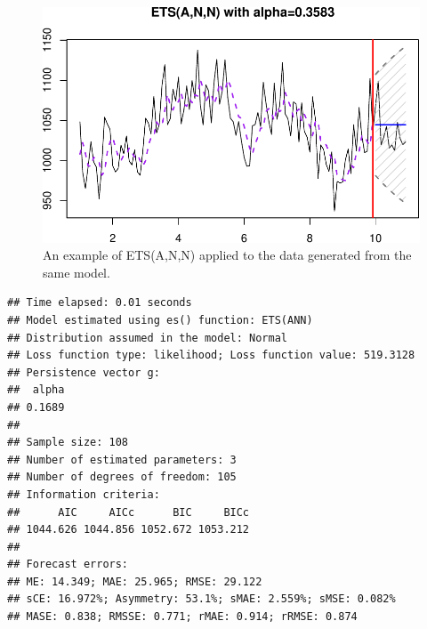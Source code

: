 \documentclass[
]{book}
\newenvironment{Shaded}{\begin{snugshade}}{\end{snugshade}}
\newcommand{\AttributeTok}[1]{\textcolor[rgb]{0.77,0.63,0.00}{#1}}
\newcommand{\CommentTok}[1]{\textcolor[rgb]{0.56,0.35,0.01}{\textit{#1}}}
\newcommand{\ConstantTok}[1]{\textcolor[rgb]{0.00,0.00,0.00}{#1}}
\newcommand{\DecValTok}[1]{\textcolor[rgb]{0.00,0.00,0.81}{#1}}
\newcommand{\FloatTok}[1]{\textcolor[rgb]{0.00,0.00,0.81}{#1}}
\newcommand{\FunctionTok}[1]{\textcolor[rgb]{0.00,0.00,0.00}{#1}}
\newcommand{\NormalTok}[1]{#1}
\newcommand{\OtherTok}[1]{\textcolor[rgb]{0.56,0.35,0.01}{#1}}
\newcommand{\SpecialCharTok}[1]{\textcolor[rgb]{0.00,0.00,0.00}{#1}}
\newcommand{\StringTok}[1]{\textcolor[rgb]{0.31,0.60,0.02}{#1}}
\theoremstyle{definition}
\theoremstyle{definition}
\theoremstyle{definition}
\theoremstyle{definition}
\theoremstyle{remark}
\begin{document}
\begin{Shaded}
\end{Shaded}

\begin{figure}
\centering
\includegraphics{Svetunkov--2022----ADAM_files/figure-latex/ETSANNExample-1.pdf}
\caption{\label{fig:ETSANNExample}An example of ETS(A,N,N) applied to the data generated from the same model.}
\end{figure}

\begin{verbatim}
## Time elapsed: 0.01 seconds
## Model estimated using es() function: ETS(ANN)
## Distribution assumed in the model: Normal
## Loss function type: likelihood; Loss function value: 519.3128
## Persistence vector g:
##  alpha 
## 0.1689 
## 
## Sample size: 108
## Number of estimated parameters: 3
## Number of degrees of freedom: 105
## Information criteria:
##      AIC     AICc      BIC     BICc 
## 1044.626 1044.856 1052.672 1053.212 
## 
## Forecast errors:
## ME: 14.349; MAE: 25.965; RMSE: 29.122
## sCE: 16.972%; Asymmetry: 53.1%; sMAE: 2.559%; sMSE: 0.082%
## MASE: 0.838; RMSSE: 0.771; rMAE: 0.914; rRMSE: 0.874
\end{verbatim}
\end{document}
